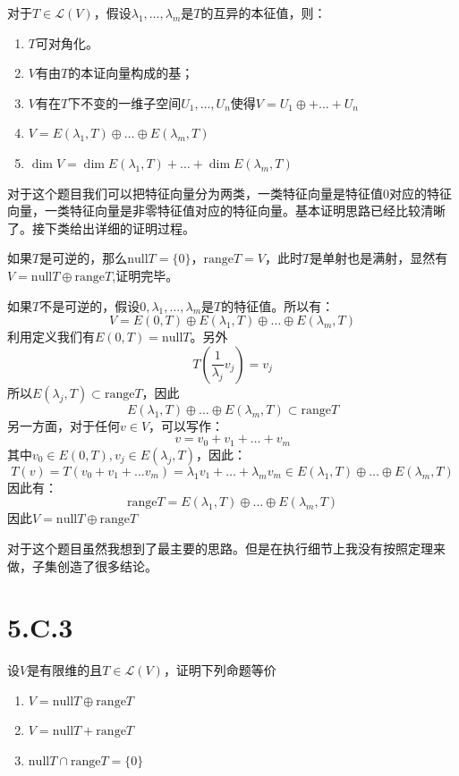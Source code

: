 \documentclass[10pt,a4paper,UTF8]{article}
\begin{document}
\begin{answer}
对于\(T\in \mathcal{L}(V)\)，假设\(\lambda_{1},\ldots ,\lambda_{m}\)是\(T\)的互异的本征值，则：
\begin{enumerate}
\item \(T\)可对角化。
\item \(V\)有由\(T\)的本证向量构成的基；
\item \(V\)有在\(T\)下不变的一维子空间\(U_{1},\ldots ,U_{n}\)使得\(V= U_{1}\oplus + \ldots + U_{n}\)
\item \(V = E(\lambda_{1},T) \oplus \ldots \oplus E(\lambda_{m},T)\)
\item \(\dim V = \dim E(\lambda_{1},T) + \ldots + \dim E(\lambda_{m},T)\)
\end{enumerate}

对于这个题目我们可以把特征向量分为两类，一类特征向量是特征值\(0\)对应的特征向量，一类特征向量是非零特征值对应的特征向量。基本证明思路已经比较清晰了。接下类给出详细的证明过程。

如果\(T\)是可逆的，那么\(\mathrm{null}T = \{0\}\)，\(\mathrm{range}T = V\)，此时\(T\)是单射也是满射，显然有\(V = \mathrm{null}T \oplus \mathrm{range}T\),证明完毕。

如果\(T\)不是可逆的，假设\(0,\lambda_{1},\ldots ,\lambda_{m}\)是\(T\)的特征值。所以有：
\begin{equation}
\label{eq:1}
V = E(0,T) \oplus  E(\lambda_{1},T) \oplus \ldots \oplus E(\lambda_{m},T)
\end{equation}
利用定义我们有\(E(0,T) = \mathrm{null}T\)。另外
\[T(\frac{1}{\lambda_{j}}v_{j}) = v_{j}\]
所以\(E(\lambda_{j},T)\subset \mathrm{range}T\)，因此
\[E(\lambda_{1},T)\oplus \ldots \oplus E(\lambda_{m},T) \subset \mathrm{range}T\]
另一方面，对于任何\(v\in V\)，可以写作：
\[v= v_{0} + v_{1} + \ldots +v_{m}\]
其中\(v_{0}\in E(0,T),v_{j}\in E(\lambda_{j},T)\)，因此：
\[T(v) = T(v_{0}+ v_{1} + \ldots v_{m}) = \lambda_{1}v_{1} + \ldots  +\lambda_{m}v_{m} \in E(\lambda_{1},T) \oplus \ldots \oplus E(\lambda_{m},T)\]
因此有：
\[\mathrm{range}T = E(\lambda_{1},T) \oplus \ldots \oplus E(\lambda_{m},T) \]
因此\(V = \mathrm{null}T \oplus \mathrm{range}T\)

对于这个题目虽然我想到了最主要的思路。但是在执行细节上我没有按照定理来做，子集创造了很多结论。
\end{answer}
\section{5.C.3}
\label{sec:orge564890}


\begin{problem}
设\(V\)是有限维的且\(T\in \mathcal{L}(V)\)，证明下列命题等价
\begin{enumerate}
\item \(V = \mathrm{null}T \oplus \mathrm{range}T\)
\item \(V = \mathrm{null}T + \mathrm{range}T\)
\item \(\mathrm{null}T \cap \mathrm{range}T = \{0\}\)
\end{enumerate}
\end{problem}
\end{document}
